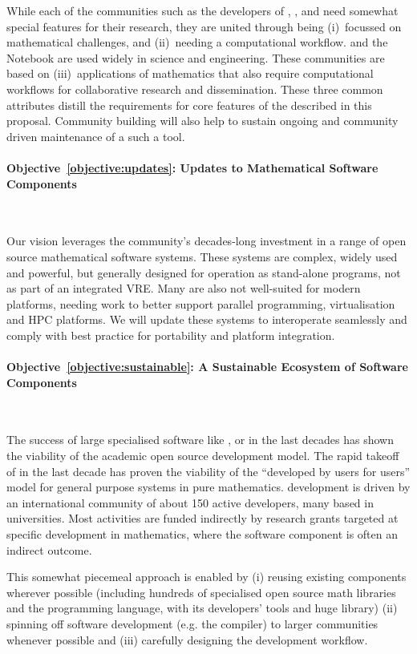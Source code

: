 \documentclass[noworkareas,deliverables,\classoptions]{euproposal}       %
\begin{document}
\begin{proposal}
While each of the communities such as the developers of \Sage,
\Singular, and \GAP need somewhat special features for their research,
they are united through being (i)~focussed on mathematical challenges,
and (ii)~needing a computational workflow. \IPython and the \Jupyter
Notebook are used widely in science and engineering. These communities
are based on (iii)~applications of mathematics that also require
computational workflows for collaborative research and
dissemination. These three common attributes distill the requirements
for core features of the \VREs described in this proposal. Community
building will also help to sustain ongoing and community driven
maintenance of a such a tool.


\paragraph{Objective~\ref{objective:updates}: Updates to Mathematical
  Software Components}\

Our vision leverages the community's decades-long investment in a
range of open source mathematical software systems. These systems are
complex, widely used and powerful, but generally designed for
operation as stand-alone programs, not as part of an integrated
VRE. Many are also not well-suited for modern platforms, needing work
to better support parallel programming, virtualisation and HPC
platforms. We will update these systems to interoperate seamlessly and
comply with best practice for portability and platform integration.


\paragraph{Objective~\ref{objective:sustainable}: A Sustainable
  Ecosystem of Software Components}\

The success of large specialised software like \PariGP, \Singular or
\GAP in the last decades has shown the viability of the academic open
source development model. The rapid takeoff of \Sage in the last
decade has proven the viability of the ``developed by users for
users'' model for general purpose systems in pure mathematics.  \Sage
development is driven by an international community of about 150
active developers, many based in universities.  Most activities are
funded indirectly by research grants targeted at specific development
in mathematics, where the software component is often an indirect
outcome.

This somewhat piecemeal approach is enabled by (i) reusing existing
components wherever possible (including hundreds of specialised open
source math libraries and the \Python programming language, with its
developers' tools and huge library) (ii) spinning off software
development (e.g. the \Cython compiler) to larger communities whenever
possible and (iii) carefully designing the development workflow.


\end{proposal}
\end{document}
